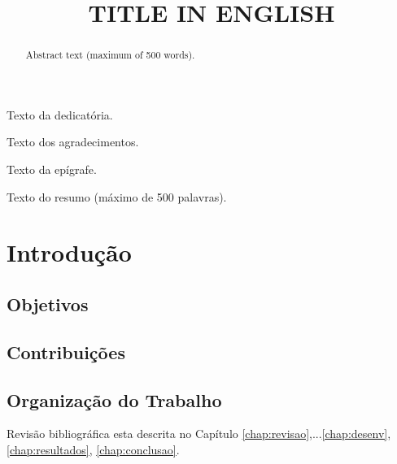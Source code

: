 \documentclass[openright]{normas-utf-tex} %
\title{\MakeUppercase{Title in english}} %
\begin{document}
\capa %
\folhaderosto %

\begin{dedicatoria}
Texto da dedicatória.
\end{dedicatoria}

\begin{agradecimentos}
Texto dos agradecimentos.
\end{agradecimentos}

\begin{epigrafe}
Texto da epígrafe.
\end{epigrafe}

\begin{resumo}
Texto do resumo (máximo de 500 palavras).
\end{resumo}

\begin{abstract}
Abstract text (maximum of 500 words).
\end{abstract}

\listadefiguras %
\listadetabelas %
\listadealgoritmos
\listadesiglas %
\listadesimbolos %
\sumario 

%
%
\chapter{Introdução}



\section{Objetivos}



\section{Contribuições}



\section{Organização do Trabalho}
Revisão bibliográfica esta descrita no Capítulo \ref{chap:revisao},...\ref{chap:desenv}, \ref{chap:resultados}, \ref{chap:conclusao}.
\end{document}
